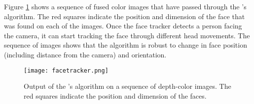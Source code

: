 Figure \ref{facetrackersequence} shows a sequence of fused color images that have passed through the
\FaceTracker{}'s algorithm. The red squares indicate the position and dimension of the face that was found 
on each of the images. Once the face tracker detects a person facing the camera, it can start tracking the face
through different head movements. The sequence of images shows that the algorithm is robust to change in 
face position (including distance from the camera) and orientation.

\begin{figure}[t]
\center
\texttt{[image: facetracker.png]}
\caption[Output of the \FaceTracker{}'s algorithm]{Output of the \FaceTracker{}'s algorithm on a sequence 
of depth-color images. The red squares indicate the position and dimension of the faces.}
\label{facetrackersequence}
\end{figure}
